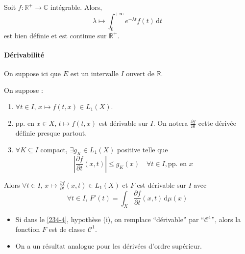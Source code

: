
  \begin{example}
    Soit $f : \mathbb{R}^+ \rightarrow \mathbb{C}$ intégrable. Alors,
    \[ \lambda \mapsto \int_0^{+\infty} e^{-\lambda t} f(t) \, \mathrm{d}t \]
    est bien définie et est continue sur $\mathbb{R}^+$.
  \end{example}

  \paragraph{Dérivabilité}


  On suppose ici que $E$ est un intervalle $I$ ouvert de $\mathbb{R}$.

  \begin{theorem}
    \label{234-4}
    On suppose :
    \begin{enumerate}[label=(\roman*)]
      \item $\forall t \in I$, $x \mapsto f(t,x) \in L_1(X)$.
      \item pp. en $x \in X$, $t \mapsto f(t,x)$ est dérivable sur $I$. On notera $\frac{\partial f}{\partial t}$ cette dérivée définie presque partout.
      \item $\forall K \subseteq I$ compact, $\exists g_K \in L_1(X)$ positive telle que
      \[ \left| \frac{\partial f}{\partial t}(x,t) \right| \leq g_K(x) \quad \forall t \in I, \text{pp. en } x \]
    \end{enumerate}
    Alors $\forall t \in I$, $x \mapsto \frac{\partial f}{\partial t}(x, t) \in L_1(X)$ et $F$ est dérivable sur $I$ avec
    \[ \forall t \in I, \, F'(t) = \int_X \frac{\partial f}{\partial t}(x, t) \, \mathrm{d}\mu(x) \]
  \end{theorem}

  \begin{remark}
    \begin{itemize}
      \item Si dans le \cref{234-4}, hypothèse (i), on remplace ``dérivable'' par ``$\mathcal{C}^1$'', alors la fonction $F$ est de classe $\mathcal{C}^1$.
      \item On a un résultat analogue pour les dérivées d'ordre supérieur.
    \end{itemize}
  \end{remark}

